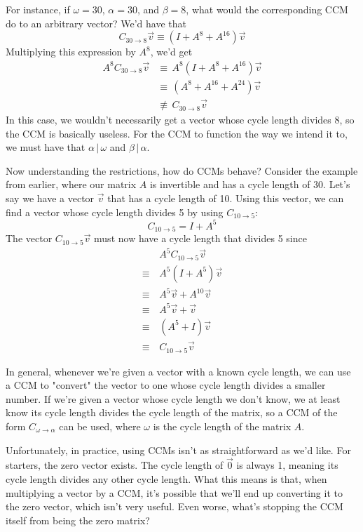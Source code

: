 \documentclass[a4paper, 12pt, reqno]{amsart}
\begin{document}
	For instance, if $\omega = 30$, $\alpha = 30$, and $\beta = 8$, what would the corresponding CCM do to an arbitrary vector? We'd have that
	\[
		C_{30\rightarrow8}\vec{v} \equiv (I + A^8 + A^{16})\vec{v}
	\]
	Multiplying this expression by $A^8$, we'd get
	\begin{align*}
		A^8C_{30\rightarrow8}\vec{v} &\equiv\,     A^8(I + A^8 + A^{16})\vec{v}   \\
		                             &\equiv\,     (A^8 + A^{16} + A^{24})\vec{v} \\
									 &\not\equiv\, C_{30\rightarrow8}\vec{v}
	\end{align*}
	In this case, we wouldn't necessarily get a vector whose cycle length divides 8, so the CCM is basically useless. For the CCM to function the way we intend it to, we must 
	have that $\alpha\,|\,\omega$ and $\beta\,|\,\alpha$.
	
	Now understanding the restrictions, how do CCMs behave? Consider the example from earlier, where our matrix $A$ is invertible and has a cycle length of 30. Let's say we
	have a vector $\vec{v}$ that has a cycle length of 10. Using this vector, we can find a vector whose cycle length divides 5 by using $C_{10\rightarrow5}$:
	\[
		C_{10 \rightarrow 5} = I + A^{5}
	\]
	The vector $C_{10 \rightarrow 5}\vec{v}$ must now have a cycle length that divides 5 since
	\begin{align*}
	           & \, A^{5}C_{10 \rightarrow 5}\vec{v} \\
		\equiv & \, A^{5}(I + A^{5})\vec{v}          \\
		\equiv & \, A^{5}\vec{v} + A^{10}\vec{v}     \\
		\equiv & \, A^{5}\vec{v} + \vec{v}           \\
		\equiv & \, (A^{5} + I)\vec{v}               \\
		\equiv & \, C_{10 \rightarrow 5}\vec{v}
	\end{align*}
	
	In general, whenever we're given a vector with a known cycle length, we can use a CCM to "convert" the vector to one whose cycle length divides a smaller number. If 
	we're given a vector whose cycle length we don't know, we at least know its cycle length divides the cycle length of the matrix, so a CCM of the form 
	$C_{\omega \rightarrow \alpha}$ can be used, where $\omega$ is the cycle length of the matrix $A$.
	
	Unfortunately, in practice, using CCMs isn't as straightforward as we'd like. For starters, the zero vector exists. The cycle length of $\vec{0}$ is always 1, meaning 
	its cycle length divides any other cycle length. What this means is that, when multiplying a vector by a CCM, it's possible that we'll end up converting it to the zero
	vector, which isn't very useful. Even worse, what's stopping the CCM itself from being the zero matrix? 
	
\end{document}
